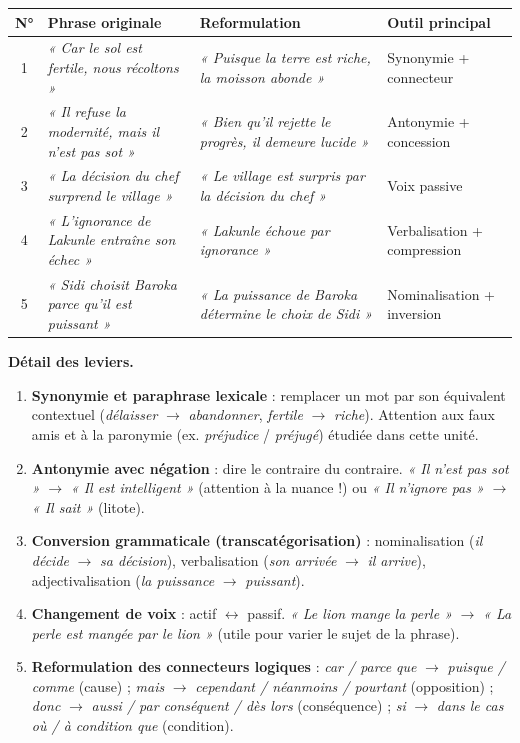 \documentclass[11pt]{article}
\newcommand{\cle}[1]{{\popxbold\color{popdark}#1}}
\begin{document}
\begin{center}
\begin{tabularx}{\linewidth}{|c|X|X|l|}
\hline
\rowcolor{popblueL} \textbf{N°} & \textbf{Phrase originale} & \textbf{Reformulation} & \textbf{Outil principal} \\
\hline
1 & \emph{« Car le sol est fertile, nous récoltons »} & \emph{« Puisque la terre est riche, la moisson abonde »} & Synonymie + connecteur \\
\hline
2 & \emph{« Il refuse la modernité, mais il n'est pas sot »} & \emph{« Bien qu'il rejette le progrès, il demeure lucide »} & Antonymie + concession \\
\hline
3 & \emph{« La décision du chef surprend le village »} & \emph{« Le village est surpris par la décision du chef »} & Voix passive \\
\hline
4 & \emph{« L'ignorance de Lakunle entraîne son échec »} & \emph{« Lakunle échoue par ignorance »} & Verbalisation + compression \\
\hline
5 & \emph{« Sidi choisit Baroka parce qu'il est puissant »} & \emph{« La puissance de Baroka détermine le choix de Sidi »} & Nominalisation + inversion \\
\hline
\end{tabularx}
\end{center}

\textbf{Détail des leviers.}\par
\begin{enumerate}
    \item \textbf{Synonymie et paraphrase lexicale} : remplacer un mot par son équivalent contextuel (\emph{délaisser} $\rightarrow$ \emph{abandonner}, \emph{fertile} $\rightarrow$ \emph{riche}). Attention aux \cle{faux amis} et à la \cle{paronymie} (ex. \emph{préjudice} / \emph{préjugé}) étudiée dans cette unité.
    \item \textbf{Antonymie avec négation} : dire le contraire du contraire. \emph{« Il n'est pas sot »} $\rightarrow$ \emph{« Il est intelligent »} (attention à la nuance !) ou \emph{« Il n'ignore pas »} $\rightarrow$ \emph{« Il sait »} (litote).
    \item \textbf{Conversion grammaticale (transcatégorisation)} : nominalisation (\emph{il décide} $\rightarrow$ \emph{sa décision}), verbalisation (\emph{son arrivée} $\rightarrow$ \emph{il arrive}), adjectivalisation (\emph{la puissance} $\rightarrow$ \emph{puissant}).
    \item \textbf{Changement de voix} : actif $\leftrightarrow$ passif. \emph{« Le lion mange la perle »} $\rightarrow$ \emph{« La perle est mangée par le lion »} (utile pour varier le sujet de la phrase).
    \item \textbf{Reformulation des connecteurs logiques} : \emph{car / parce que} $\rightarrow$ \emph{puisque / comme} (cause) ; \emph{mais} $\rightarrow$ \emph{cependant / néanmoins / pourtant} (opposition) ; \emph{donc} $\rightarrow$ \emph{aussi / par conséquent / dès lors} (conséquence) ; \emph{si} $\rightarrow$ \emph{dans le cas où / à condition que} (condition).
\end{enumerate}
\end{document}
